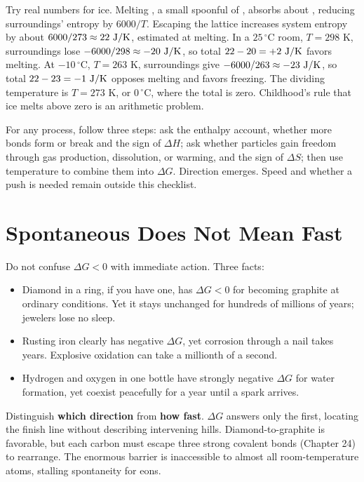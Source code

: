 Try real numbers for ice. Melting , a small spoonful of , absorbs about , reducing surroundings' entropy by $6000/T$. Escaping the lattice increases system entropy by about $6000/273\approx22\ \mathrm{J/K}$, estimated at melting. In a $25\,^{\circ}\mathrm{C}$ room, $T=298$ K, surroundings lose $-6000/298\approx-20\ \mathrm{J/K}$, so total $22-20=+2\ \mathrm{J/K}$ favors melting. At $-10\,^{\circ}\mathrm{C}$, $T=263$ K, surroundings give $-6000/263\approx-23\ \mathrm{J/K}$, so total $22-23=-1\ \mathrm{J/K}$ opposes melting and favors freezing. The dividing temperature is $T=273$ K, or $0\,^{\circ}\mathrm{C}$, where the total is zero. Childhood's rule that ice melts above zero is an arithmetic problem.

For any process, follow three steps: ask the enthalpy account, whether more bonds form or break and the sign of $\Delta H$; ask whether particles gain freedom through gas production, dissolution, or warming, and the sign of $\Delta S$; then use temperature to combine them into $\Delta G$. Direction emerges. Speed and whether a push is needed remain outside this checklist.

\section{Spontaneous Does Not Mean Fast}

Do not confuse $\Delta G<0$ with immediate action. Three facts:

\begin{itemize}[itemsep=2pt]
\item Diamond in a ring, if you have one, has $\Delta G<0$ for becoming graphite at ordinary conditions. Yet it stays unchanged for hundreds of millions of years; jewelers lose no sleep.
\item Rusting iron clearly has negative $\Delta G$, yet corrosion through a nail takes years. Explosive oxidation can take a millionth of a second.
\item Hydrogen and oxygen in one bottle have strongly negative $\Delta G$ for water formation, yet coexist peacefully for a year until a spark arrives.
\end{itemize}

Distinguish \textbf{which direction} from \textbf{how fast}. $\Delta G$ answers only the first, locating the finish line without describing intervening hills. Diamond-to-graphite is favorable, but each carbon must escape three strong covalent bonds (Chapter 24) to rearrange. The enormous barrier is inaccessible to almost all room-temperature atoms, stalling spontaneity for eons.

